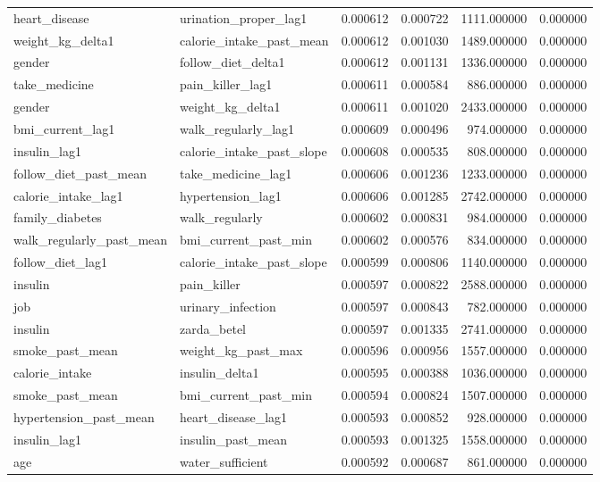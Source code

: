\begin{longtable}{llrrrr}
heart\_disease & urination\_proper\_lag1 & 0.000612 & 0.000722 & 1111.000000 & 0.000000 \\
weight\_kg\_delta1 & calorie\_intake\_past\_mean & 0.000612 & 0.001030 & 1489.000000 & 0.000000 \\
gender & follow\_diet\_delta1 & 0.000612 & 0.001131 & 1336.000000 & 0.000000 \\
take\_medicine & pain\_killer\_lag1 & 0.000611 & 0.000584 & 886.000000 & 0.000000 \\
gender & weight\_kg\_delta1 & 0.000611 & 0.001020 & 2433.000000 & 0.000000 \\
bmi\_current\_lag1 & walk\_regularly\_lag1 & 0.000609 & 0.000496 & 974.000000 & 0.000000 \\
insulin\_lag1 & calorie\_intake\_past\_slope & 0.000608 & 0.000535 & 808.000000 & 0.000000 \\
follow\_diet\_past\_mean & take\_medicine\_lag1 & 0.000606 & 0.001236 & 1233.000000 & 0.000000 \\
calorie\_intake\_lag1 & hypertension\_lag1 & 0.000606 & 0.001285 & 2742.000000 & 0.000000 \\
family\_diabetes & walk\_regularly & 0.000602 & 0.000831 & 984.000000 & 0.000000 \\
walk\_regularly\_past\_mean & bmi\_current\_past\_min & 0.000602 & 0.000576 & 834.000000 & 0.000000 \\
follow\_diet\_lag1 & calorie\_intake\_past\_slope & 0.000599 & 0.000806 & 1140.000000 & 0.000000 \\
insulin & pain\_killer & 0.000597 & 0.000822 & 2588.000000 & 0.000000 \\
job & urinary\_infection & 0.000597 & 0.000843 & 782.000000 & 0.000000 \\
insulin & zarda\_betel & 0.000597 & 0.001335 & 2741.000000 & 0.000000 \\
smoke\_past\_mean & weight\_kg\_past\_max & 0.000596 & 0.000956 & 1557.000000 & 0.000000 \\
calorie\_intake & insulin\_delta1 & 0.000595 & 0.000388 & 1036.000000 & 0.000000 \\
smoke\_past\_mean & bmi\_current\_past\_min & 0.000594 & 0.000824 & 1507.000000 & 0.000000 \\
hypertension\_past\_mean & heart\_disease\_lag1 & 0.000593 & 0.000852 & 928.000000 & 0.000000 \\
insulin\_lag1 & insulin\_past\_mean & 0.000593 & 0.001325 & 1558.000000 & 0.000000 \\
age & water\_sufficient & 0.000592 & 0.000687 & 861.000000 & 0.000000 \\

\end{longtable}
